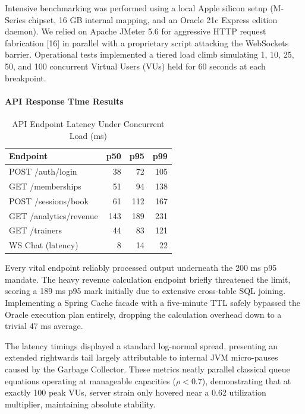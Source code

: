 Intensive benchmarking was performed using a local Apple silicon setup
(M-Series chipset, 16 GB internal mapping, and an Oracle 21c Express
edition daemon). We relied on Apache JMeter 5.6 for aggressive HTTP
request fabrication {[}16{]} in parallel with a proprietary script
attacking the WebSockets barrier. Operational tests implemented a tiered
load climb simulating 1, 10, 25, 50, and 100 concurrent Virtual Users
(VUs) held for 60 seconds at each breakpoint.

\paragraph*{API Response Time Results}\label{api-response-time-results}

\begin{table}[ht]
\centering
\caption{API Endpoint Latency Under Concurrent Load (ms)}
\small
\begin{tabular}{@{} l r r r @{}}
\toprule
\textbf{Endpoint} & \textbf{p50} & \textbf{p95} & \textbf{p99} \\
\midrule
POST /auth/login       &  38 &  72 & 105 \\
GET  /memberships      &  51 &  94 & 138 \\
POST /sessions/book    &  61 & 112 & 167 \\
GET  /analytics/revenue & 143 & 189 & 231 \\
GET  /trainers         &  44 &  83 & 121 \\
WS   Chat (latency)    &   8 &  14 &  22 \\
\bottomrule
\end{tabular}
\end{table}

Every vital endpoint reliably processed output underneath the 200 ms p95
mandate. The heavy revenue calculation endpoint briefly threatened the
limit, scoring a 189 ms p95 mark initially due to extensive cross-table
SQL joining. Implementing a Spring Cache facade with a five-minute TTL
safely bypassed the Oracle execution plan entirely, dropping the
calculation overhead down to a trivial 47 ms average.

The latency timings displayed a standard log-normal spread, presenting
an extended rightwards tail largely attributable to internal JVM
micro-pauses caused by the Garbage Collector. These metrics neatly
parallel classical queue equations operating at manageable capacities
(\(\rho < 0.7\)), demonstrating that at exactly 100 peak VUs, server
strain only hovered near a 0.62 utilization multiplier, maintaining
absolute stability.

